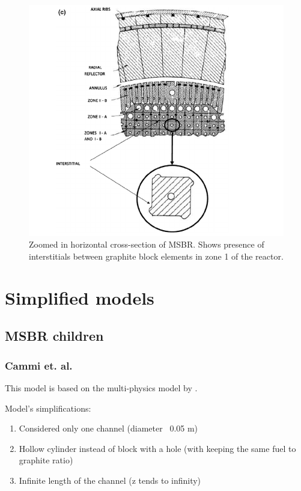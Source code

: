 \documentclass{article}
\let\Oldsection\section
\renewcommand{\section}{\FloatBarrier\Oldsection}
\let\Oldsubsection\subsection
\renewcommand{\subsection}{\FloatBarrier\Oldsubsection}
\let\Oldsubsubsection\subsubsection
\renewcommand{\subsubsection}{\FloatBarrier\Oldsubsubsection}
\begin{document}
\begin{figure}[htpb]
  \centering
  \includegraphics[max height=.5\textheight,max width=\textwidth,keepaspectratio]{zoomed_horizontal_MSBR_cross_section.png}
  \caption{Zoomed in horizontal cross-section of MSBR. Shows presence of
    interstitials between graphite block elements in zone 1 of the reactor.}
  \label{fig:zoom_horiz}
\end{figure}

\section{Simplified models}

\subsection{MSBR children}

\subsubsection{Cammi et. al.}

This model is based on the multi-physics model by
\cite{cammi_multi-physics_2011}.

Model's simplifications:
\begin{enumerate}
	\item Considered only one channel (diameter ~0.05 m)
	\item Hollow cylinder instead of block with a hole (with keeping the same fuel to graphite ratio)
	\item Infinite length of the channel (z tends to infinity)
\end{enumerate}
\end{document}
